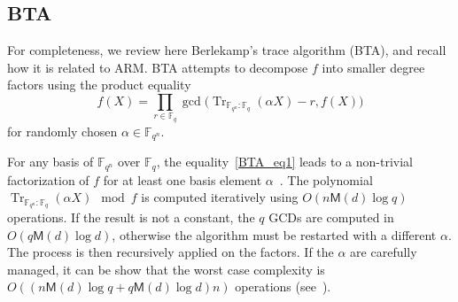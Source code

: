\documentclass{sig-alternate}
\newcommand{\ff}[1]{\mathbb{F}_{#1}}
\newcommand{\fq}{\ff{q}}
\newcommand{\fqn}{\ff{q^n}}
\newcommand{\dd}{d}
\newcommand{\qq}{q}
\newcommand{\nn}{n}
\newcommand{\qn}{{\qq^\nn}}
\newcommand{\basef}{\ff{\qq}}
\newcommand{\extf}{\ff{\qn}}
\DeclareMathOperator{\Tr}{Tr}
\newcommand{\trabs}[2]{\Tr_{#1:#2}}
\newcommand{\trextbase}{\trabs{\extf}{\basef}}
\newcommand{\bigO}{O}
\newcommand{\Mul}{\mathsf{M}}
\newcounter{algo}
\newtheorem{Lem}{Lemma}
\begin{document}
 
 
 
 \subsection{BTA}
\label{sec:bta}

For completeness, we review here Berlekamp's trace algorithm (BTA),
and recall how it is related to ARM. BTA attempts to decompose $f$
into smaller degree factors using the product equality
\begin{equation}\label{BTA_eq1}
f(X)=\prod_{r\in\fq}\gcd\bigl(\trextbase(\alpha X)-r,f(X)\bigr)
\end{equation}
for randomly chosen $\alpha\in\fqn$.



%
For any basis of $\extf$ over $\basef$, the equality~\eqref{BTA_eq1} leads to a non-trivial factorization of $f$ for at least one basis element $\alpha$~\cite{berl70}.
The polynomial $\trextbase(\alpha X) \mod f$ is computed iteratively using
$O(\nn\Mul(d)\log\qq)$ operations. If the result is not a constant,
the $\qq$ GCDs are computed in $O(\qq\Mul(d)\log\dd)$, otherwise the
algorithm must be restarted with a different $\alpha$. 
The process is then recursively applied on the factors. 
 If the $\alpha$ are carefully managed, it can be show that the worst case complexity is 
$\bigO((\nn\Mul(d)\log\qq+\qq\Mul(d)\log\dd) \nn)$ 
operations (see~\cite{Menvanovans92}).




\end{document}
